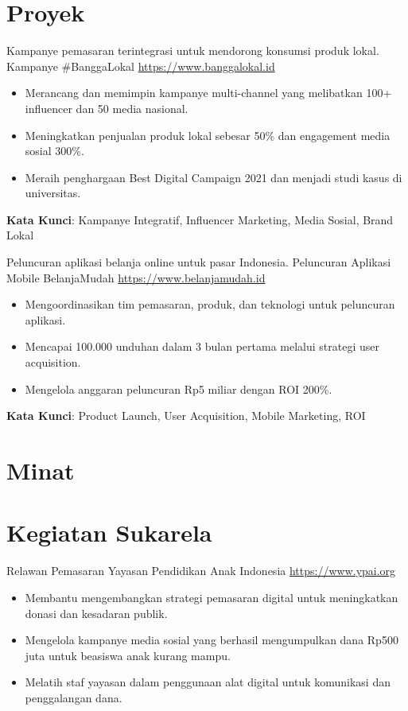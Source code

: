 \documentclass[a4paper, serif, 10pt]{moderncv}
\begin{document}
\section{Proyek}

        {Kampanye pemasaran terintegrasi untuk mendorong konsumsi produk lokal.}
        {Kampanye \#BanggaLokal}
        {\url{https://www.banggalokal.id}}
        {}
        {\begin{itemize}
\item Merancang dan memimpin kampanye multi-channel yang melibatkan 100+ influencer dan 50 media nasional.
\item Meningkatkan penjualan produk lokal sebesar 50\% dan engagement media sosial 300\%.
\item Meraih penghargaan Best Digital Campaign 2021 dan menjadi studi kasus di universitas.
\end{itemize}
\textbf{Kata Kunci}: Kampanye Integratif, Influencer Marketing, Media Sosial, Brand Lokal}

        {Peluncuran aplikasi belanja online untuk pasar Indonesia.}
        {Peluncuran Aplikasi Mobile BelanjaMudah}
        {\url{https://www.belanjamudah.id}}
        {}
        {\begin{itemize}
\item Mengoordinasikan tim pemasaran, produk, dan teknologi untuk peluncuran aplikasi.
\item Mencapai 100.000 unduhan dalam 3 bulan pertama melalui strategi user acquisition.
\item Mengelola anggaran peluncuran Rp5 miliar dengan ROI 200\%.
\end{itemize}
\textbf{Kata Kunci}: Product Launch, User Acquisition, Mobile Marketing, ROI}
\section{Minat}

\section{Kegiatan Sukarela}

        {Relawan Pemasaran}
        {Yayasan Pendidikan Anak Indonesia}
        {\url{https://www.ypai.org}}
        {}
        {\begin{itemize}
\item Membantu mengembangkan strategi pemasaran digital untuk meningkatkan donasi dan kesadaran publik.
\item Mengelola kampanye media sosial yang berhasil mengumpulkan dana Rp500 juta untuk beasiswa anak kurang mampu.
\item Melatih staf yayasan dalam penggunaan alat digital untuk komunikasi dan penggalangan dana.
\end{itemize}}
    
\end{document}
